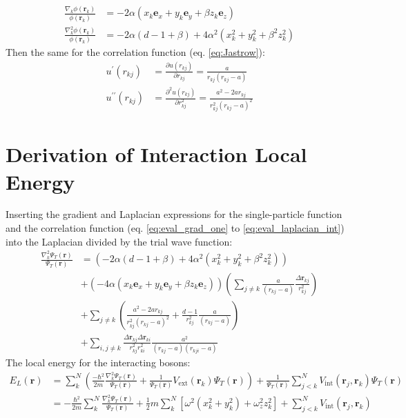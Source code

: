 \documentclass[12pt,a4paper,english]{article}
\begin{document}
\begin{align}
\label{eq:eval_grad_one}
\frac{\nabla_k\phi(\textbf{r}_k)}{\phi(\textbf{r}_k)}&=-2\alpha(x_k\textbf{e}_x+y_k\textbf{e}_y+\beta z_k\textbf{e}_z)\\
\label{eq:eval_laplacian_one}
\frac{\nabla_k^2\phi(\textbf{r}_k)}{\phi(\textbf{r}_k)}&=-2\alpha(d-1+\beta)+4\alpha^2(x_k^2+y_k^2+\beta^2z_k^2)
\end{align}
Then the same for the correlation function (eq. \ref{eq:Jastrow}):
\begin{align}
\label{eq:eval_grad_int}
u^{\prime}(r_{kj})&=\frac{\partial u(r_{kj})}{\partial r_{kj}}=\frac{a}{r_{kj}(r_{kj}-a)}\\
\label{eq:eval_laplacian_int}
u^{\prime\prime}(r_{kj})&=\frac{\partial^2 u(r_{kj})}{\partial r_{kj}^2}=\frac{a^2-2ar_{kj}}{r_{kj}^2(r_{kj}-a)^2}
\end{align}

\section{Derivation of Interaction Local Energy}
\label{appendix:local_E}
Inserting the gradient and Laplacian expressions for the single-particle function and the correlation function (eq. \ref{eq:eval_grad_one} to \ref{eq:eval_laplacian_int}) into the Laplacian divided by the trial wave function:
\begin{align}
\label{eq:H_int_deriv}
\frac{\nabla_k^2\Psi_T(\textbf{r})}{\Psi_T(\textbf{r})}&= \left(-2\alpha(d-1+\beta)+4\alpha^2(x_k^2+y_k^2+\beta^2z_k^2)\right)\nonumber\\
&+\left(-4\alpha(x_k\textbf{e}_x+y_k\textbf{e}_y+\beta z_k\textbf{e}_z)\right)\left(\sum_{j\neq k}\frac{a}{(r_{kj}-a)}\frac{\Delta\textbf{r}_{kj}}{r_{kj}^2}\right)\nonumber\\
&+\sum_{j\neq k}\left(\frac{a^2-2ar_{kj}}{r_{kj}^2(r_{kj}-a)^2}+\frac{d-1}{r_{kj}^2}\frac{a}{(r_{kj}-a)}\right)\nonumber\\
&+\sum_{i,j\neq k}\frac{\Delta \textbf{r}_{kj}\Delta \textbf{r}_{ki}}{r_{kj}^2r_{ki}^2}\frac{a^2}{(r_{kj}-a)(r_{kji}-a)}
\end{align}
The local energy for the interacting bosons:
\begin{align}
\label{eq:local_E_deriv}
E_L(\textbf{r})&=\sum_k^N\left(\frac{-\hbar^2}{2m}\frac{\nabla_k^2\Psi_T(\textbf{r})}{\Psi_T(\textbf{r})}+\frac{1}{\Psi_T(\mathbf{r})}V_{\text{ext}}(\textbf{r}_k)\Psi_T(\mathbf{r})\right)+\frac{1}{\Psi_T(\mathbf{r})}\sum_{j<k}^{N}V_{\text{int}}(\textbf{r}_j,\textbf{r}_k)\Psi_T(\mathbf{r})\nonumber\\
&=-\frac{\hbar^2}{2m}\sum_k^N\frac{\nabla_k^2\Psi_T(\textbf{r})}{\Psi_T(\textbf{r})}
+\frac{1}{2}m\sum_k^N[\omega^2(x_k^2+y_k^2) + \omega_z^2z_k^2]
+\sum_{j<k}^{N}V_{\text{int}}(\textbf{r}_j,\textbf{r}_k)
\end{align}



\end{document}
